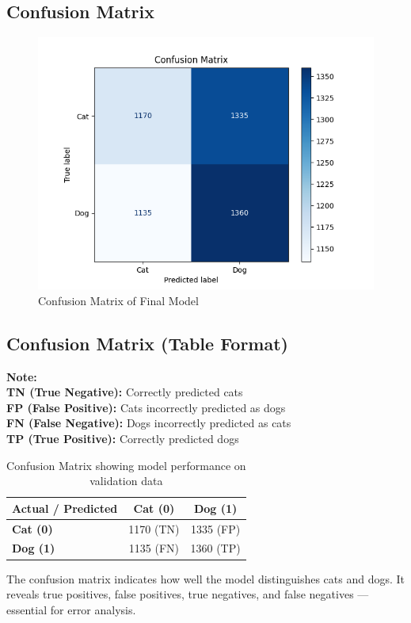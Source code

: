 \documentclass{article}
\begin{document}
\subsection*{Confusion Matrix}
\begin{figure}[H]
\centering
\includegraphics[width=0.6\linewidth]{confusion_matrix.png}
\caption{Confusion Matrix of Final Model}
\end{figure}

\subsection*{Confusion Matrix (Table Format)}

\noindent
\textbf{Note:} \\
\textbf{TN (True Negative):} Correctly predicted cats \\
\textbf{FP (False Positive):} Cats incorrectly predicted as dogs \\
\textbf{FN (False Negative):} Dogs incorrectly predicted as cats \\
\textbf{TP (True Positive):} Correctly predicted dogs

\begin{table}[H]
\centering
\begin{tabular}{|l|c|c|}
\hline
\textbf{Actual / Predicted} & \textbf{Cat (0)} & \textbf{Dog (1)} \\
\hline
\textbf{Cat (0)} & 1170 (TN) & 1335 (FP) \\
\hline
\textbf{Dog (1)} & 1135 (FN) & 1360 (TP) \\
\hline
\end{tabular}
\caption{Confusion Matrix showing model performance on validation data}
\end{table}

The confusion matrix indicates how well the model distinguishes cats and dogs. It reveals true positives, false positives, true negatives, and false negatives — essential for error analysis.
\end{document}
